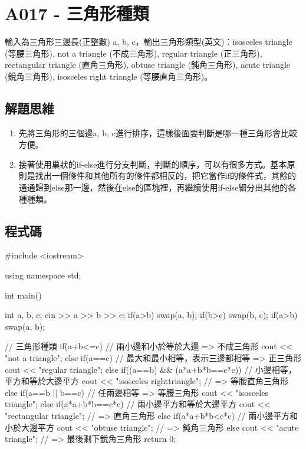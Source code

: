 \section{A017 - 三角形種類}
輸入為三角形三邊長(正整數) a, b, c，輸出三角形類型(英文)：isosceles triangle (等腰三角形), not a triangle (不成三角形), regular triangle (正三角形), rectangular triangle (直角三角形), obtuse triangle (鈍角三角形), acute triangle (銳角三角形), isosceles right triangle (等腰直角三角形)。

\subsection{解題思維}
\begin{enumerate}
\item 先將三角形的三個邊a, b, c進行排序，這樣後面要判斷是哪一種三角形會比較方便。
\item 接著使用巢狀的if-else進行分支判斷，判斷的順序，可以有很多方式。基本原則是找出一個條件和其他所有的條件都相反的，把它當作if的條件式，其餘的通通歸到else那一邊，然後在else的區塊裡，再繼續使用if-else細分出其他的各種種類。
\end{enumerate}

\subsection{程式碼}
\begin{cppcode}
	#include <iostream>
	
	using namespace std;
	
	int main()
	{
		int a, b, c;
		cin >> a >> b >> c;
		if(a>b) swap(a, b);
		if(b>c) swap(b, c);
		if(a>b) swap(a, b);
		
		// 三角形種類
		if(a+b<=c) { // 兩小邊和小於等於大邊 => 不成三角形
			cout << "not a triangle";
		} else if(a==c) { // 最大和最小相等，表示三邊都相等 => 正三角形
			cout << "regular triangle"; 
		} else if((a==b) && (a*a+b*b==c*c)) { // 小邊相等，平方和等於大邊平方
			cout << "isosceles righttriangle"; // => 等腰直角三角形
		} else if(a==b || b==c) { // 任兩邊相等 => 等腰三角形
			cout << "isosceles triangle";
		} else if(a*a+b*b==c*c) { // 兩小邊平方和等於大邊平方
			cout << "rectangular triangle"; // => 直角三角形
		} else if(a*a+b*b<c*c) { // 兩小邊平方和小於大邊平方
			cout << "obtuse triangle"; // => 鈍角三角形
		} else cout << "acute triangle"; // => 最後剩下銳角三角形
		return 0;
	}
\end{cppcode}
